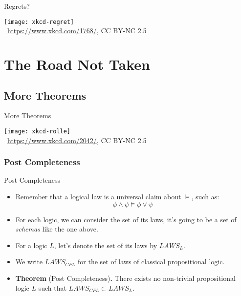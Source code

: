 \documentclass[../slides.tex]{subfiles}
\begin{document}
\begin{frame}{Regrets?}

\begin{center}
  \texttt{[image: xkcd-regret]}\\
  {\tiny \textcopyright~\url{https://www.xkcd.com/1768/}, CC BY-NC 2.5}
\end{center}

\end{frame}


\section{The Road Not Taken}
\subsection{More Theorems}

\begin{frame}{More Theorems} 

\begin{center}
  \texttt{[image: xkcd-rolle]}\\
  {\tiny \textcopyright~\url{https://www.xkcd.com/2042/}, CC BY-NC 2.5}
\end{center}

\end{frame}

\subsubsection{Post Completeness}

\begin{frame}{Post Completeness}

  \begin{itemize}
  \item Remember that a logical law is a universal claim about
    $\vDash$, such as: \[\phi\land \psi\vDash
      \phi\lor \psi\]

  \item For each logic, we can consider the set of its laws, it's
    going to be a set of \emph{schemas} like the one above.

  \item For a logic $L$, let's denote the set of its laws by
    $LAWS_L$.

   \item We write $LAWS_{CPL}$ for the set of laws of classical
    propositional logic.

  \item \textbf{Theorem} (Post Completeness)\textbf{.} There exists no
    non-trivial propositional logic $L$ such that $LAWS_{CPL}\subset
    LAWS_L$. 
    
  \end{itemize}
  
\end{frame}
\end{document}
